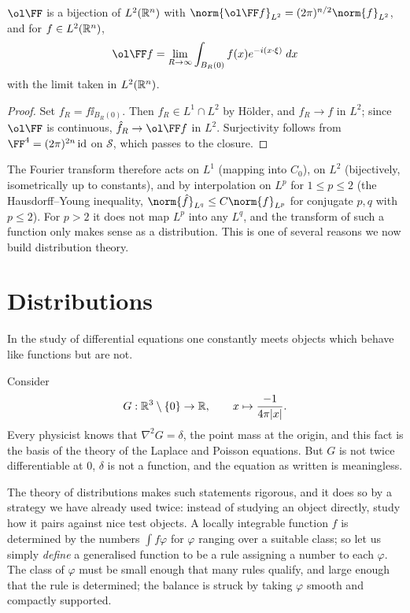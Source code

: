 \documentclass[a4paper]{scrartcl}
\newcommand{\id}{\operatorname{id}}
\newcommand{\Sch}{\mathcal{S}}
\begin{document}
\begin{proposition}
	$\ol\FF$ is a bijection of $L^2(\mathbb{R}^n)$ with $\norm{\ol\FF f}_{L^2}=(2\pi)^{n/2}\norm{f}_{L^2}$, and for $f \in L^2(\mathbb{R}^n)$,
	$$\ol\FF f = \lim_{R\to\infty}\int_{B_R(0)}f(x)e^{-i(x\cdot\xi)}\dd x$$
	with the limit taken in $L^2(\mathbb{R}^n)$.
\end{proposition}

\begin{proof}
	Set $f_R = f\ii_{B_R(0)}$. Then $f_R \in L^1 \cap L^2$ by H\"older, and $f_R \to f$ in $L^2$; since $\ol\FF$ is continuous, $\hat f_R \to \ol\FF f$ in $L^2$. Surjectivity follows from $\FF^4 = (2\pi)^{2n}\id$ on $\Sch$, which passes to the closure.
\end{proof}

\begin{remark}
	The Fourier transform therefore acts on $L^1$ (mapping into $C_0$), on $L^2$ (bijectively, isometrically up to constants), and by interpolation on $L^p$ for $1 \le p \le 2$ (the Hausdorff--Young inequality, $\norm{\hat f}_{L^q}\le C\norm{f}_{L^p}$ for conjugate $p,q$ with $p \le 2$). For $p > 2$ it does not map $L^p$ into any $L^q$, and the transform of such a function only makes sense as a distribution. This is one of several reasons we now build distribution theory.
\end{remark}

\section{Distributions}\label{sec:dist}

In the study of differential equations one constantly meets objects which behave like functions but are not.

\begin{example}\label{ex:greenmotivation}
	Consider
	$$G : \mathbb{R}^3\setminus\{0\}\to\mathbb{R}, \qquad x \mapsto \frac{-1}{4\pi|x|}.$$
	Every physicist knows that $\nabla^2 G = \delta$, the point mass at the origin, and this fact is the basis of the theory of the Laplace and Poisson equations. But $G$ is not twice differentiable at $0$, $\delta$ is not a function, and the equation as written is meaningless.
\end{example}

The theory of distributions makes such statements rigorous, and it does so by a strategy we have already used twice: instead of studying an object directly, study how it pairs against nice test objects. A locally integrable function $f$ is determined by the numbers $\int f\varphi$ for $\varphi$ ranging over a suitable class; so let us simply \emph{define} a generalised function to be a rule assigning a number to each $\varphi$. The class of $\varphi$ must be small enough that many rules qualify, and large enough that the rule is determined; the balance is struck by taking $\varphi$ smooth and compactly supported.
\end{document}
